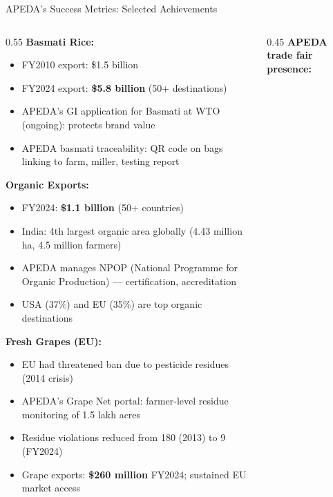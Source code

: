 \documentclass[
  ignorenonframetext,
  aspectratio=169,
]{beamer}
\makeatletter
\providecommand{\tightlist}{%
  \setlength{\itemsep}{0pt}\setlength{\parskip}{0pt}}
\let\quarto@originallabel\label
\DeclareRobustCommand*{\label}[1]{\quarto@originallabel{#1}}
\makeatother
\begin{document}
\begin{frame}{APEDA's Success Metrics: Selected Achievements}
\label{apedas-success-metrics-selected-achievements}
\begin{columns}[T]
\begin{column}{0.55\linewidth}
\textbf{Basmati Rice:}

\begin{itemize}
\tightlist
\item
  FY2010 export: \$1.5 billion\\
\item
  FY2024 export: \textbf{\$5.8 billion} (50+ destinations)
\item
  APEDA's GI application for Basmati at WTO (ongoing): protects brand
  value
\item
  APEDA basmati traceability: QR code on bags linking to farm, miller,
  testing report
\end{itemize}

\textbf{Organic Exports:}

\begin{itemize}
\tightlist
\item
  FY2024: \textbf{\$1.1 billion} (50+ countries)
\item
  India: 4th largest organic area globally (4.43 million ha, 4.5 million
  farmers)
\item
  APEDA manages NPOP (National Programme for Organic Production) ---
  certification, accreditation
\item
  USA (37\%) and EU (35\%) are top organic destinations
\end{itemize}

\textbf{Fresh Grapes (EU):}

\begin{itemize}
\tightlist
\item
  EU had threatened ban due to pesticide residues (2014 crisis)
\item
  APEDA's Grape Net portal: farmer-level residue monitoring of 1.5 lakh
  acres
\item
  Residue violations reduced from 180 (2013) to 9 (FY2024)
\item
  Grape exports: \textbf{\$260 million} FY2024; sustained EU market
  access
\end{itemize}
\end{column}

\begin{column}{0.45\linewidth}
\textbf{APEDA trade fair presence:}


\end{column}
\end{columns}
\end{frame}
\end{document}
